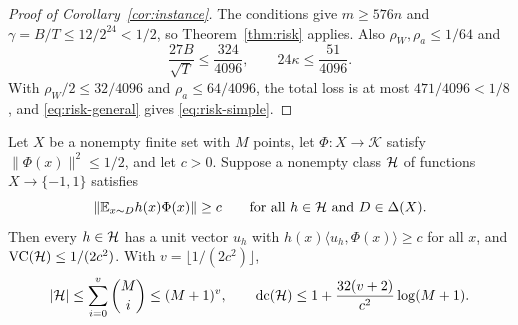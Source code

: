 \documentclass[11pt,letterpaper,pmlr,twoside]{jmlr}
\newcommand{\Kc}{\mathcal K}\newcommand{\sgn}{\operatorname{sign}}
\newcommand{\ip}[2]{\langle #1,#2\rangle}\newcommand{\norm}[1]{\lVert #1\rVert}
\begin{document}
\begin{proof}[Proof of Corollary~\ref{cor:instance}]
The conditions give $m\ge576n$ and $\gamma=B/T\le12/2^{24}<1/2$, so Theorem~\ref{thm:risk} applies. Also $\rho_W,\rho_a\le1/64$ and
\[
 \frac{27B}{\sqrt T}\le\frac{324}{4096},\qquad
 24\kappa\le\frac{51}{4096}.
\]
With $\rho_W/2\le32/4096$ and $\rho_a\le64/4096$, the total loss is at most $471/4096<1/8$, and \eqref{eq:risk-general} gives \eqref{eq:risk-simple}.
\end{proof}

\begin{lemma}
\label{lem:geometry}
Let $X$ be a nonempty finite set with $M$ points, let $\Phi:X\to\Kc$ satisfy $\norm{\Phi(x)}^2\le1/2$, and let $c>0$. Suppose a nonempty class $\mathcal H$ of functions $X\to\{-1,1\}$ satisfies
\begin{equation}
 \norm{\E_{x\sim D}h(x)\Phi(x)}\ge c\qquad\text{for all }h\in\Hc\text{ and }D\in\Delta(X).
 \label{eq:allmarginal}
\end{equation}
Then every $h\in\mathcal H$ has a unit vector $u_h$ with $h(x)\ip{u_h}{\Phi(x)}\ge c$ for all $x$, and $\operatorname{VC}(\mathcal H)\le1/(2c^2)$. With $v=\lfloor1/(2c^2)\rfloor$,
\[
 |\mathcal H|\le\sum_{i=0}^{v}\binom Mi\le(M+1)^v,\qquad
 \operatorname{dc}(\mathcal H)\le1+\frac{32(v+2)}{c^2}\log(M+1).
\]
\end{lemma}
\end{document}
